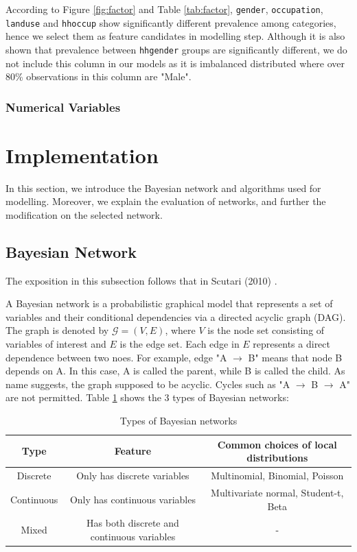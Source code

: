 \documentclass[11pt,twoside]{article}
\numberwithin{Theorem}{section}
\numberwithin{Definition}{section}
\numberwithin{Lemma}{section}
\numberwithin{Algorithm}{section}
\numberwithin{equation}{section}
\begin{document}
According to Figure \ref{fig:factor} and Table \ref{tab:factor}, \texttt{gender},  \texttt{occupation}, \texttt{landuse} and \texttt{hhoccup} show significantly different prevalence among categories, hence we select them as feature candidates in modelling step. Although it is also shown that prevalence between \texttt{hhgender} groups are significantly different, we do not include this column in our models as it is imbalanced distributed where over 80\% observations in this column are "Male".

\subsubsection{Numerical Variables}



\clearpage

\section{Implementation}
\label{sec:implementation}

In this section, we introduce the Bayesian network and algorithms used for modelling. Moreover, we explain the evaluation of networks, and further the modification on the selected network.

\subsection{Bayesian Network}

The exposition in this subsection follows that in Scutari (2010) \cite{scutari2010learning}.

A Bayesian network is a probabilistic graphical model that represents a set of variables and their conditional dependencies via a directed acyclic graph (DAG). The graph is denoted by $\mathcal{G} = (V,E)$, where $V$ is the node set consisting of variables of interest and $E$ is the edge set. Each edge in $E$ represents a direct dependence between two noes.  For example, edge "A $\rightarrow$ B" means that node B depends on A. In this case, A is called the parent, while B is called the child. As name suggests, the graph supposed to be acyclic. Cycles such as "A $\rightarrow$ B $\rightarrow$ A" are not permitted. Table \ref{tab:bn_type} shows the 3 types of Bayesian networks:

\begin{table}[!h]
	\centering
	\begin{tabular}{|c|c|c|}
		\hline
		Type & Feature & Common choices of local distributions \\
		\hline
		Discrete & Only has discrete variables & Multinomial, Binomial, Poisson \\
		Continuous & Only has continuous variables & Multivariate normal, Student-t, Beta \\
		Mixed & Has both discrete and continuous variables & - \\
		\hline
	\end{tabular}
	\caption{Types of Bayesian networks}
	\label{tab:bn_type} 
\end{table}
\end{document}

